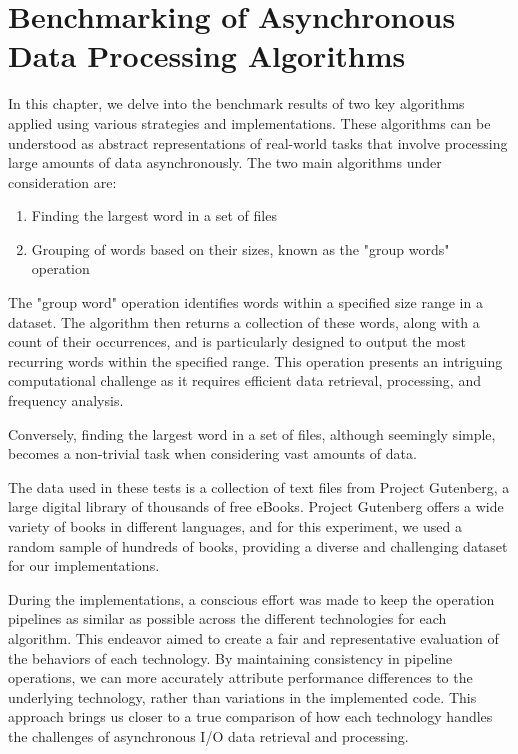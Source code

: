 

\chapter{Benchmarking of Asynchronous Data Processing Algorithms}
\label{cha:a_short_latex_tutorial_with_examples}

In this chapter, we delve into the benchmark results of two key algorithms applied using various strategies and implementations. These algorithms can be understood as abstract representations of real-world tasks that involve processing large amounts of data asynchronously. The two main algorithms under consideration are:

\begin{enumerate}
\item Finding the largest word in a set of files
\item Grouping of words based on their sizes, known as the "group words" operation
\end{enumerate}

The "group word" operation identifies words within a specified size range in a dataset. The algorithm then returns a collection of these words, along with a count of their occurrences, and is particularly designed to output the most recurring words within the specified range. This operation presents an intriguing computational challenge as it requires efficient data retrieval, processing, and frequency analysis.

Conversely, finding the largest word in a set of files, although seemingly simple, becomes a non-trivial task when considering vast amounts of data.

The data used in these tests is a collection of text files from Project Gutenberg, a large digital library of thousands of free eBooks. Project Gutenberg offers a wide variety of books in different languages, and for this experiment, we used a random sample of hundreds of books, providing a diverse and challenging dataset for our implementations.

During the implementations, a conscious effort was made to keep the operation pipelines as similar as possible across the different technologies for each algorithm. This endeavor aimed to create a fair and representative evaluation of the behaviors of each technology. By maintaining consistency in pipeline operations, we can more accurately attribute performance differences to the underlying technology, rather than variations in the implemented code. This approach brings us closer to a true comparison of how each technology handles the challenges of asynchronous I/O data retrieval and processing.

